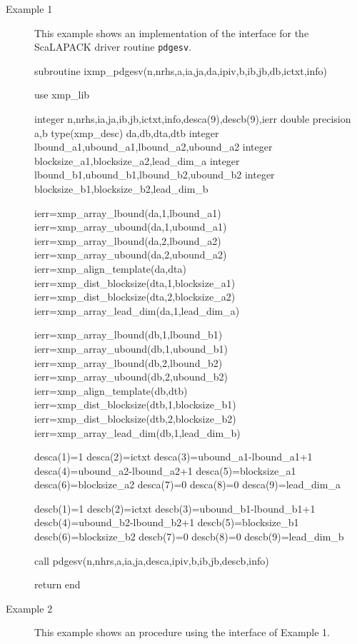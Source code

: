 \begin{description}

 \item[Example 1]
	    This example shows an implementation of the interface for
	    the ScaLAPACK driver routine {\tt pdgesv}.

\begin{XFexample}
      subroutine ixmp_pdgesv(n,nrhs,a,ia,ja,da,ipiv,b,ib,jb,db,ictxt,info)

      use xmp_lib

      integer n,nrhs,ia,ja,ib,jb,ictxt,info,desca(9),descb(9),ierr
      double precision a,b
      type(xmp_desc) da,db,dta,dtb
      integer lbound_a1,ubound_a1,lbound_a2,ubound_a2
      integer blocksize_a1,blocksize_a2,lead_dim_a
      integer lbound_b1,ubound_b1,lbound_b2,ubound_b2
      integer blocksize_b1,blocksize_b2,lead_dim_b
      
      ierr=xmp_array_lbound(da,1,lbound_a1)
      ierr=xmp_array_ubound(da,1,ubound_a1)
      ierr=xmp_array_lbound(da,2,lbound_a2)
      ierr=xmp_array_ubound(da,2,ubound_a2)
      ierr=xmp_align_template(da,dta)
      ierr=xmp_dist_blocksize(dta,1,blocksize_a1)
      ierr=xmp_dist_blocksize(dta,2,blocksize_a2)
      ierr=xmp_array_lead_dim(da,1,lead_dim_a)
      
      ierr=xmp_array_lbound(db,1,lbound_b1)
      ierr=xmp_array_ubound(db,1,ubound_b1)
      ierr=xmp_array_lbound(db,2,lbound_b2)
      ierr=xmp_array_ubound(db,2,ubound_b2)
      ierr=xmp_align_template(db,dtb)
      ierr=xmp_dist_blocksize(dtb,1,blocksize_b1)
      ierr=xmp_dist_blocksize(dtb,2,blocksize_b2)
      ierr=xmp_array_lead_dim(db,1,lead_dim_b)
      
      desca(1)=1
      desca(2)=ictxt
      desca(3)=ubound_a1-lbound_a1+1
      desca(4)=ubound_a2-lbound_a2+1
      desca(5)=blocksize_a1
      desca(6)=blocksize_a2
      desca(7)=0
      desca(8)=0
      desca(9)=lead_dim_a
      
      descb(1)=1
      descb(2)=ictxt
      descb(3)=ubound_b1-lbound_b1+1
      descb(4)=ubound_b2-lbound_b2+1
      descb(5)=blocksize_b1
      descb(6)=blocksize_b2
      descb(7)=0
      descb(8)=0
      descb(9)=lead_dim_b
      
      call pdgesv(n,nhrs,a,ia,ja,desca,ipiv,b,ib,jb,descb,info)
      
      return
      end

\end{XFexample}


\item[Example 2]
	   This example shows an {\XMP} procedure using the interface of
	   Example 1.


\end{description}
